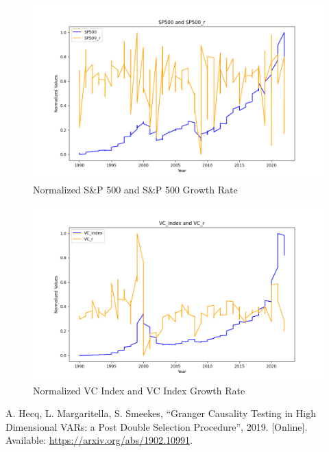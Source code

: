 \documentclass[12pt]{article}
\begin{document}
\begin{figure}[H]
    \centering
    \includegraphics[width=0.75\linewidth]{SP500_SP500_r.png}
    \caption{Normalized S\&P 500 and S\&P 500 Growth Rate}
    \label{fig:enter-label}
\end{figure}
\begin{figure}[H]
    \centering
    \includegraphics[width=0.75\linewidth]{VC_index_VC_r.png}
    \caption{Normalized VC Index and VC Index Growth Rate}
    \label{fig:enter-label}
\end{figure}

















\begin{thebibliography}{9}
A. Hecq, L. Margaritella, S. Smeekes, “Granger Causality Testing in High Dimensional VARs: a Post Double Selection Procedure”, 2019. [Online]. Available: \url{https://arxiv.org/abs/1902.10991}.
\end{thebibliography}
\end{document}
